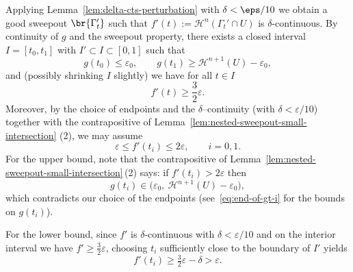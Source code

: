 Applying Lemma~\ref{lem:delta-cts-perturbation} with $\delta<\eps/10$ we obtain a good sweepout
$\br{\Gamma_t'}$ such that $f'(t):=\mathcal{H}^{n}(\Gamma_t'\cap U)$ is $\delta$-continuous. 
By continuity of $g$ and the sweepout property, there exists a closed interval $I=[t_0,t_1]$ with $I'\subset I\subset[0,1]$ such that
\begin{equation}\label{eq:end-of-gt-i}
  g(t_0)\le \varepsilon_0,\qquad g(t_1)\ge \mathcal{H}^{n+1}(U)-\varepsilon_0,
\end{equation}
and (possibly shrinking $I$ slightly) we have for all $t\in I$
\begin{equation*}
  f'(t) \ge \frac{3}{2}\varepsilon.
\end{equation*}
Moreover, by the choice of endpoints and the $\delta$–continuity (with $\delta<\varepsilon/10$) together with the contrapositive of Lemma~\ref{lem:nested-sweepout-small-intersection} (2), we may assume
\begin{equation*}
  \varepsilon \le f'(t_i) \le 2\varepsilon, \qquad i=0,1.
\end{equation*}
For the upper bound, note that the contrapositive of Lemma~\ref{lem:nested-sweepout-small-intersection}\,(2) says:
if $f'(t_i)>2\varepsilon$ then 
\begin{equation*}
    g(t_i)\in\bigl(\varepsilon_0,\ \mathcal{H}^{n+1}(U)-\varepsilon_0),
\end{equation*}
which contradicts our choice of the endpoints (see~\eqref{eq:end-of-gt-i} for the bounds on $g(t_i)$).

For the lower bound, since $f'$ is $\delta$-continuous with $\delta<\varepsilon/10$ and
on the interior interval we have $f'\ge \tfrac{3}{2}\varepsilon$, choosing $t_i$ sufficiently close to the boundary of $I'$ yields
\begin{equation*}
    f'(t_i) \ge \tfrac{3}{2}\varepsilon-\delta > \varepsilon.
\end{equation*}

